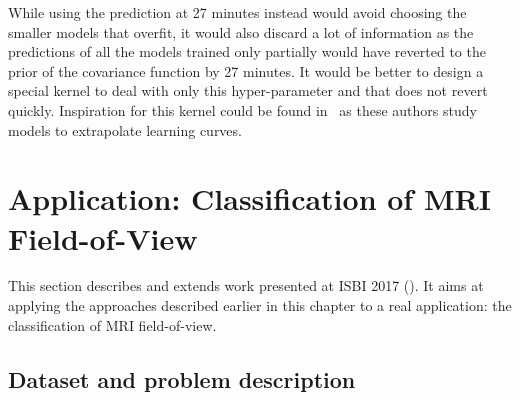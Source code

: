 While using the prediction at 27 minutes instead would avoid choosing the smaller models that overfit, it would also discard a lot of information as the predictions of all the models trained only partially would have reverted to the prior of the covariance function by 27 minutes. It would be better to design a special kernel to deal with only this hyper-parameter and that does not revert quickly. Inspiration for this kernel could be found in~\textcite{domhan2015} as these authors study models to extrapolate learning curves.

\section{Application: Classification of MRI Field-of-View}
\label{sec:isbi}

This section describes and extends work presented at ISBI 2017 (\textcite{bertrand2017ISBI}). It aims at applying the approaches described earlier in this chapter to a real application: the classification of MRI field-of-view.

\subsection{Dataset and problem description}

